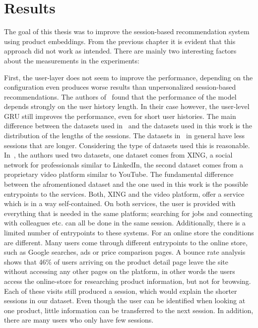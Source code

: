 
\chapter{Results}
The goal of this thesis was to improve the session-based recommendation system using product embeddings.
From the previous chapter it is evident that this approach did not work as intended.
There are mainly two interesting factors about the measurements in the experiments:
\par
First, the user-layer does not seem to improve the performance, depending on the configuration even produces worse results than unpersonalized session-based recommendations.
The authors of~\cite{hierarchical} found that the performance of the model depends strongly on the user history length.
In their case however, the user-level GRU still improves the performance, even for short user histories.
The main difference between the datasets used in~\cite{hierarchical} and the datasets used in this work is the distribution of the lengths of the sessions.
The datasets in~\cite{hierarchical} in general have less sessions that are longer.
Considering the type of datasets used this is reasonable.
In~\cite{hierarchical}, the authors used two datasets, one dataset comes from XING, a social network for professionals similar to LinkedIn, the second dataset comes from a proprietary video platform similar to YouTube.
The fundamental difference between the afromentioned dataset and the one used in this work is the possible entrypoints to the services.
Both, XING and the video platform, offer a service which is in a way self-contained.
On both services, the user is provided with everything that is needed in the same platform; searching for jobs and connecting with colleagues etc. can all be done in the same session.
Additionally, there is a limited number of entrypoints to these systems.
For an online store the conditions are different.
Many users come through different entrypoints to the online store, such as Google searches, ads or price comparison pages.
A bounce rate analysis shows that 46\% of users arriving on the product detail page leave the site without accessing any other pages on the platform, in other words the users access the online-store for researching product information, but not for browsing.
Each of these visits still produced a session, which would explain the shorter sessions in our dataset.
Even though the user can be identified when looking at one product, little information can be transferred to the next session.
In addition, there are many users who only have few sessions.
